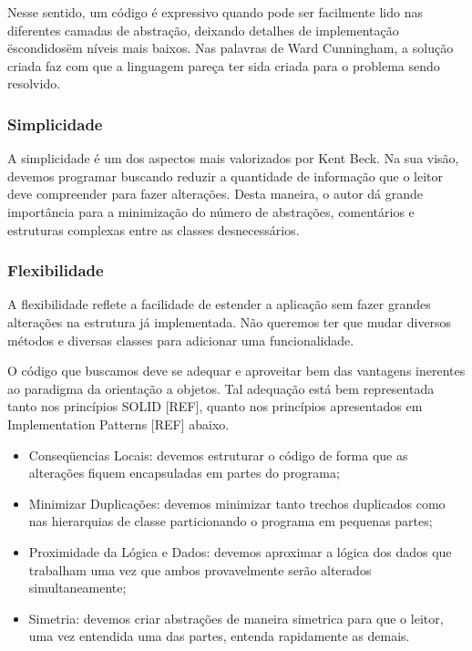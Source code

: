 Nesse sentido, um código é expressivo quando pode ser facilmente lido nas diferentes camadas de abstração, deixando detalhes de implementação \"escondidos\" em níveis mais baixos. Nas palavras de Ward Cunningham, a solução criada faz com que a linguagem pareça ter sida criada para o problema sendo resolvido.

\subsubsection{Simplicidade}
A simplicidade é um dos aspectos mais valorizados por Kent Beck. Na sua visão, devemos programar buscando reduzir a quantidade de informação que o leitor deve compreender para fazer alterações. Desta maneira, o autor dá grande importância para a minimização do número de abstrações, comentários e estruturas complexas entre as classes desnecessários.

\subsubsection{Flexibilidade}
A flexibilidade reflete a facilidade de estender a aplicação sem fazer grandes alterações na estrutura já implementada. Não queremos ter que mudar diversos métodos e diversas classes para adicionar uma funcionalidade.

O código que buscamos deve se adequar e aproveitar bem das vantagens inerentes ao paradigma da orientação a objetos. Tal adequação está bem representada tanto nos princípios SOLID [REF], quanto nos princípios apresentados em Implementation Patterns [REF] abaixo.

\begin{itemize}
	\item Conseqüencias Locais: devemos estruturar o código de forma que as alterações fiquem encapsuladas em partes do programa;
	\item Minimizar Duplicações: devemos minimizar tanto trechos duplicados como nas hierarquias de classe particionando o programa em pequenas partes;
	\item Proximidade da Lógica e Dados: devemos aproximar a lógica dos dados que trabalham uma vez que ambos provavelmente serão alterados simultaneamente;
	\item Simetria: devemos criar abstrações de maneira simetrica para que o leitor, uma vez entendida uma das partes, entenda rapidamente as demais.
\end{itemize}



